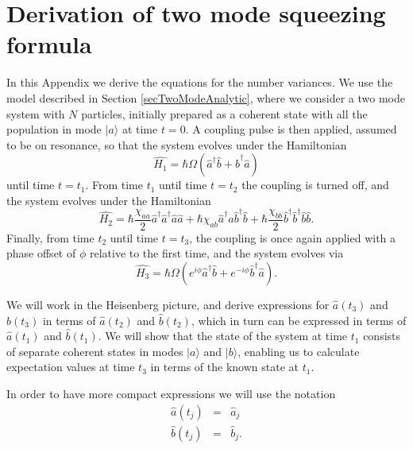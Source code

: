 \documentclass{iopart}
\begin{document}
\section{Derivation of two mode squeezing formula}
\label{appendixTwoModeDerivation}
In this Appendix we derive the equations for the number variances. We use the model described in Section \ref{secTwoModeAnalytic}, where we consider a two mode system with $N$ particles, initially prepared as a coherent state with all the population in mode $|a\rangle$ at time $t=0$. A coupling pulse is then applied, assumed to be on resonance, so that the system evolves under the Hamiltonian
\begin{equation}
\hat{H_1} = \hbar \Omega (\hat{a}^{\dagger} \hat{b} + \hat{b}^{\dagger} \hat{a} )
\end{equation}
until time $t=t_1$. From time $t_1$ until time $t=t_2$ the coupling is turned off, and the system evolves under the Hamiltonian
\begin{equation}
\hat{H_2} = \hbar\frac{\chi_{aa}}{2} \hat{a}^{\dagger} \hat{a}^{\dagger} \hat{a} \hat{a}
          + \hbar\chi_{ab} \hat{a}^{\dagger} \hat{a} \hat{b}^{\dagger} \hat{b}
          + \hbar\frac{\chi_{bb}}{2} \hat{b}^{\dagger} \hat{b}^{\dagger} \hat{b} \hat{b}.
\end{equation}
Finally, from time $t_2$ until time $t=t_3$, the coupling is once again applied with a phase offset of $\phi$ relative to the first time, and the system evolves via
\begin{equation}
\hat{H_3} = \hbar\Omega (e^{i\phi} \hat{a}^{\dagger} \hat{b} + e^{-i\phi} \hat{b}^{\dagger} \hat{a} ).
\end{equation}

We will work in the Heisenberg picture, and derive expressions for $\hat{a}(t_3)$ and $\hat{b}(t_3)$ in terms of $\hat{a}(t_2)$ and $\hat{b}(t_2)$, which in turn can be expressed in terms of $\hat{a}(t_1)$ and $\hat{b}(t_1)$. We will show that the state of the system at time $t_1$ consists of separate coherent states in modes $|a\rangle$ and $|b\rangle$, enabling us to calculate expectation values at time $t_3$ in terms of the known state at $t_1$.

In order to have more compact expressions we will use the notation
\begin{eqnarray}
\hat{a}(t_j) &=& \hat{a}_j \\
\hat{b}(t_j) &=& \hat{b}_j.
\end{eqnarray}
\end{document}

